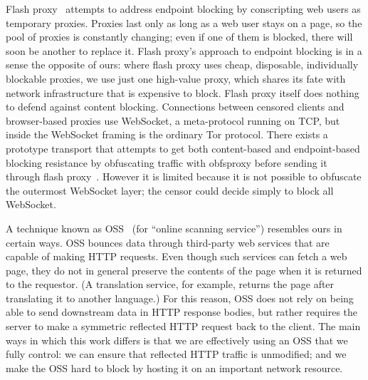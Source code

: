 \documentclass{article}
\begin{document}
Flash proxy~\cite{flashproxy} attempts to address endpoint blocking by
conscripting web users as temporary proxies. Proxies last only as long as a web
user stays on a page, so the pool of proxies is constantly changing;
even if one of them is blocked, there will soon be another to replace it.
Flash proxy's approach to endpoint blocking is in a sense
the opposite of ours: where flash proxy uses cheap, disposable, individually blockable proxies,
we use just one high-value proxy, which shares its fate with network
infrastructure that is expensive to block.
Flash proxy itself does nothing to defend against content blocking.
Connections between censored clients and browser-based proxies use
WebSocket, a meta-protocol running on TCP,
but inside the WebSocket framing is the ordinary Tor protocol.
There exists a prototype transport that attempts to get both
content-based and endpoint-based blocking resistance by obfuscating traffic
with obfsproxy before sending it through flash proxy~\cite{obfs-flash}.
However it is limited because it is not
possible to obfuscate the outermost WebSocket layer;
the censor could decide simply to block all WebSocket.


A technique known as OSS~\cite{oss} (for
``online scanning service'') resembles ours in certain ways. OSS bounces data
through third-party web services that are capable of making HTTP requests.
Even though such services can fetch a web page, they do not in general
preserve the contents of the page when it is returned to the requestor.
(A translation service, for example,
returns the page after translating it to another language.)
For this reason, OSS does not rely on being able to send downstream data in HTTP response bodies,
but rather requires the server to make a symmetric reflected HTTP request back to the client.
The main ways in which this work differs is that we are effectively using an OSS that we fully control:
we can ensure that reflected HTTP traffic is unmodified;
and we make the OSS hard to block by hosting it on an important network resource.
\end{document}
